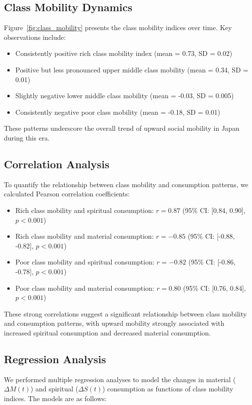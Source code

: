 \documentclass{article} %
\begin{document}
\subsection{Class Mobility Dynamics}
Figure~\ref{fig:class_mobility} presents the class mobility indices over time. Key observations include:

\begin{itemize}
    \item Consistently positive rich class mobility index (mean = 0.73, SD = 0.02)
    \item Positive but less pronounced upper middle class mobility (mean = 0.34, SD = 0.01)
    \item Slightly negative lower middle class mobility (mean = -0.03, SD = 0.005)
    \item Consistently negative poor class mobility (mean = -0.18, SD = 0.01)
\end{itemize}

These patterns underscore the overall trend of upward social mobility in Japan during this era.

\subsection{Correlation Analysis}
To quantify the relationship between class mobility and consumption patterns, we calculated Pearson correlation coefficients:

\begin{itemize}
    \item Rich class mobility and spiritual consumption: $r = 0.87$ (95\% CI: [0.84, 0.90], $p < 0.001$)
    \item Rich class mobility and material consumption: $r = -0.85$ (95\% CI: [-0.88, -0.82], $p < 0.001$)
    \item Poor class mobility and spiritual consumption: $r = -0.82$ (95\% CI: [-0.86, -0.78], $p < 0.001$)
    \item Poor class mobility and material consumption: $r = 0.80$ (95\% CI: [0.76, 0.84], $p < 0.001$)
\end{itemize}

These strong correlations suggest a significant relationship between class mobility and consumption patterns, with upward mobility strongly associated with increased spiritual consumption and decreased material consumption.

\subsection{Regression Analysis}
We performed multiple regression analyses to model the changes in material ($\Delta M(t)$) and spiritual ($\Delta S(t)$) consumption as functions of class mobility indices. The models are as follows:
\end{document}
